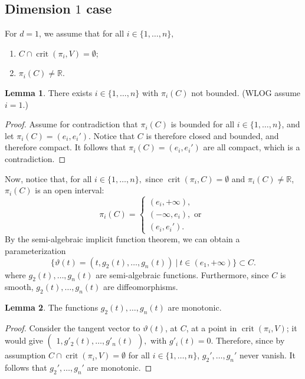 \documentclass[10pt]{article}
\theoremstyle{definition}
\newtheorem{lemma}{Lemma}
\newcommand{\R}{\mathbb{R}}
\DeclareMathOperator{\crit}{crit}
\begin{document}
\subsection{Dimension $1$ case}
For $d=1$, we assume that for all $i \in \{1,\hdots,n\},$ 
%
\begin{enumerate}
    \item $C \cap \crit(\pi_i,V) = \emptyset$;
    \item $\pi_i(C) \not = \R$.
\end{enumerate}
%
%
\begin{lemma}\label{lemma:unboundedCoordinate}
    There exists $i \in \{1,\hdots,n\}$ with $\pi_i(C)$ not bounded. (WLOG assume $i=1.$)
\end{lemma}
%
%
\begin{proof}
Assume for contradiction that $\pi_i(C)$ is bounded for all $i \in \{1,\hdots,n\}$, and let $\pi_i(C) = (e_i,e_i').$
Notice that $C$ is therefore closed and bounded, and therefore compact. It follows that $\pi_i(C)=(e_i,e_i')$ are all compact, which is a contradiction.
\end{proof}
%
\noindent
Now, notice that, for all $i \in \{1,\hdots,n\},$ since $\crit(\pi_i,C) = \emptyset$ and $\pi_i(C) \not = \R$, $\pi_i(C)$ is an open interval:
\[
\pi_i(C)=
\begin{cases}
			(e_i,+\infty), \\
                (-\infty,e_i),\textrm{ or }\\
                (e_i,e_i').
\end{cases}
\]
By the semi-algebraic implicit function theorem, we can obtain a parameterization
\[
\big\{\vartheta(t) = \left(t,g_2(t),\hdots,g_n(t)\right)~|~ t \in (e_1,+\infty)\big\} \subset C.
\]
where $g_2(t),\hdots,g_n(t)$ are semi-algebraic functions. Furthermore, since $C$ is smooth, $g_2(t),\hdots,g_n(t)$ are diffeomorphisms.
%
\begin{lemma}
The functions $g_2(t),\hdots,g_n(t)$ are monotonic. 
\end{lemma}
%
%
\begin{proof}
Consider the tangent vector to $\vartheta(t)$,
at $C$, at a point in $\crit(\pi_i,V)$; it would give $
\begin{pmatrix}
    1, 
    g'_2(t), 
    \hdots, 
    g'_n(t)
\end{pmatrix},
$ with
$g'_i(t)=0.$ Therefore, since by assumption $C \cap \crit(\pi_i,V) = \emptyset$ for all $i \in \{1,\hdots,n\}$,
$g_2',\hdots,g_n'$ never vanish. It follows that $g_2',\hdots,g_n'$ are  monotonic.
\end{proof}
\end{document}
